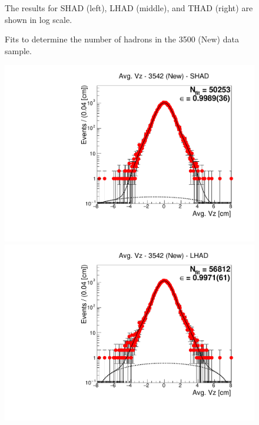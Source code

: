 \begin{figure}[H]
\caption{Fits to determine the number of hadrons in the 3500 (New) data sample.}
{The results for SHAD (left), LHAD (middle), and THAD (right) are shown in log scale.}
\label{fig:hadron_fits_3500_new}
\end{figure}

\begin{figure}[H]
\centering
\includegraphics[scale=0.25]{figures/plots/nonDDbar_fit_results/3650_new/fit_new_3542_data_SHAD.pdf}
\hspace{-0.5cm}
\includegraphics[scale=0.25]{figures/plots/nonDDbar_fit_results/3650_new/fit_new_3542_data_LHAD.pdf}
\hspace{-0.5cm}

\end{figure}
